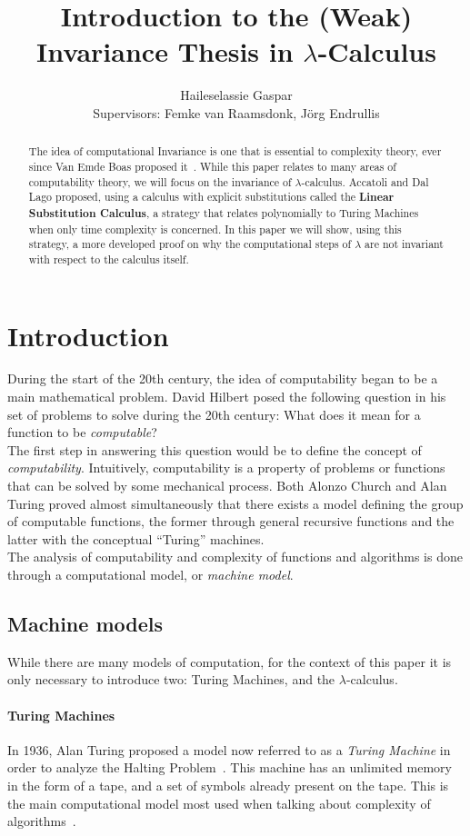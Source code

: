 \documentclass[12pt]{article}
\title{Introduction to the (Weak) Invariance Thesis in $\lambda$-Calculus}
\author{Haileselassie Gaspar\\[1cm]{\small Supervisors: Femke van Raamsdonk, Jörg Endrullis}}
\begin{document}
\maketitle
\begin{abstract}
  The idea of computational Invariance is one that is essential to complexity theory, ever since Van Emde Boas proposed it~\cite{machine-models}. While this paper relates to many areas of computability theory, we will focus on the invariance of $\lambda$-calculus. Accatoli and Dal Lago proposed, using a calculus with explicit substitutions called the \textbf{Linear Substitution Calculus}, a strategy that relates polynomially to Turing Machines when only time complexity is concerned. In this paper we will show, using this strategy, a more developed proof on why the computational steps of $\lambda$ are not invariant with respect to the calculus itself.\end{abstract}
\section{Introduction}
During the start of the 20th century, the idea of computability began to be a main mathematical problem. David Hilbert posed the following question in his set of problems to solve during the 20th century: What does it mean for a function to be \textit{computable}? \\
The first step in answering this question would be to define the concept of \textit{computability}. Intuitively, computability is a property of problems or functions that can be solved by some mechanical process. Both Alonzo Church and Alan Turing proved almost simultaneously that there exists a model defining the group of computable functions, the former through general recursive functions and the latter with the conceptual \enquote{Turing} machines. \\
The analysis of computability and complexity of functions and algorithms is done through a computational model, or \textit{machine model}.
\subsection{Machine models}
While there are many models of computation, for the context of this paper it is only necessary to introduce two: Turing Machines, and the $\lambda$-calculus.

\paragraph{Turing Machines}
In 1936, Alan Turing proposed a model now referred to as a \textit{Turing Machine} in order to analyze the Halting Problem~\cite{on-computable-numbers}. This machine has an unlimited memory in the form of a tape, and a set of symbols already present on the tape. This is the main computational model most used when talking about complexity of algorithms~\cite{computation-theory}.
\end{document}
